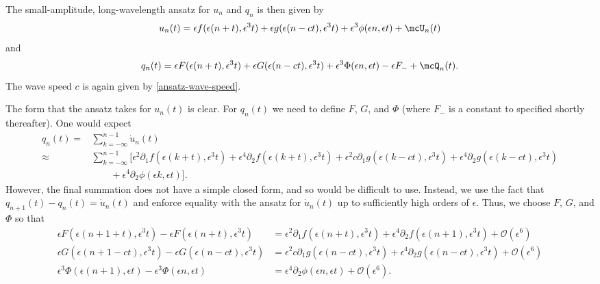 \documentclass[oneside,reqno]{amsart}
\begin{document}
The small-amplitude, long-wavelength ansatz for \(u_n\) and \(q_n\) is then given by
\begin{equation}\label{u-ansatz}
	u_n(t) = \epsilon f(\epsilon(n+t), \epsilon^3t) + \epsilon g(\epsilon(n-ct), \epsilon^3 t) + \epsilon^3 \phi(\epsilon n , \epsilon t) + \mcU_n(t)
\end{equation}
and 
\begin{equation}\label{q-ansatz}
	q_n(t) = \epsilon F(\epsilon(n+t), \epsilon^3 t) + \epsilon G(\epsilon(n-ct), \epsilon^3 t) + \epsilon^3 \Phi(\epsilon n, \epsilon t) - \epsilon F_- + \mcQ_n(t).
\end{equation}
The wave speed \(c\) is again given by \cref{ansatz-wave-speed}. 

The form that the ansatz takes for \(u_n(t)\) is clear. For \(q_n(t)\) we need to define \(F\), \(G\), and \(\Phi\) (where \(F_-\) is a constant to specified shortly thereafter). One would expect  
\begin{equation*}
	\begin{aligned}
		q_n(t) =& \sum_{k=-\infty}^{n-1} \dot u_n(t) \\
		\approx& \sum_{k=-\infty}^{n-1} [ \epsilon^2 \partial_1 f (\epsilon(k+t) ,\epsilon^3 t) + \epsilon^4 \partial_2 f(\epsilon(k+t), \epsilon^3 t) + \epsilon^2 c \partial_1 g(\epsilon (k-ct), \epsilon^3 t) +\epsilon^4 \partial_2 g(\epsilon(k-ct), \epsilon^3 t)  \\
		&\qquad + \epsilon^4 \partial_2 \phi(\epsilon k, \epsilon t) ].
	\end{aligned}
\end{equation*}
However, the final summation does not have a simple closed form, and so would be difficult to use. Instead, we use the fact that \(q_{n+1}(t) - q_n(t)= \dot u_n(t)\) and enforce equality with the ansatz for \(\dot u_n(t)\) up to sufficiently high orders of \(\epsilon\). Thus, we choose \(F\), \(G\), and \(\Phi\) so that 
\begin{equation*}
	\begin{aligned}
		\epsilon F(\epsilon (n+1 + t), \epsilon^3 t) - \epsilon F(\epsilon(n+t), \epsilon^3 t) &= \epsilon^2 \partial_1 f(\epsilon(n+t), \epsilon^3 t) + \epsilon^4 \partial_2 f(\epsilon (n+1), \epsilon^3 t) + \mathcal O(\epsilon^6) \\
		\epsilon G(\epsilon(n+1 -ct), \epsilon^3 t) - \epsilon G(\epsilon(n-ct), \epsilon^3 t) &=  \epsilon^2 c \partial_1 g(\epsilon (n-ct), \epsilon^3 t)  +\epsilon^4 \partial_2 g(\epsilon(n-ct), \epsilon^3 t) + \mathcal O(\epsilon^6) \\
		\epsilon^3 \Phi(\epsilon(n+1), \epsilon t) - \epsilon^3 \Phi(\epsilon n, \epsilon t) &= \epsilon^4 \partial_2 \phi(\epsilon n, \epsilon t) + \mathcal O(\epsilon^6) .
	\end{aligned}
\end{equation*}
\end{document}
